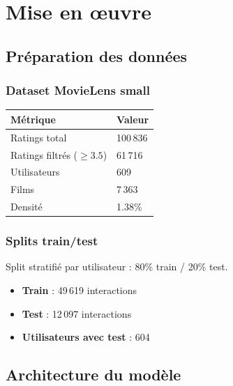 \documentclass[12pt,a4paper]{report}
\begin{document}
\chapter{Mise en \oe{}uvre}

\section{Préparation des données}

\subsection{Dataset MovieLens small}

\begin{center}
\begin{tabular}{ll}
\toprule
\textbf{Métrique} & \textbf{Valeur} \\
\midrule
Ratings total & 100\,836 \\
Ratings filtrés ($\geq 3.5$) & 61\,716 \\
Utilisateurs & 609 \\
Films & 7\,363 \\
Densité & 1.38\% \\
\bottomrule
\end{tabular}
\end{center}

\subsection{Splits train/test}

Split stratifié par utilisateur : 80\% train / 20\% test.

\begin{itemize}
  \item \textbf{Train} : 49\,619 interactions
  \item \textbf{Test} : 12\,097 interactions
  \item \textbf{Utilisateurs avec test} : 604
\end{itemize}

\section{Architecture du modèle}
\end{document}
